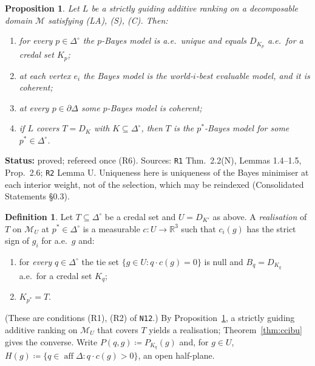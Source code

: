 \documentclass[11pt]{article}
\newtheorem{proposition}[theorem]{Proposition}
\theoremstyle{definition}
\newtheorem{definition}[theorem]{Definition}
\theoremstyle{remark}
\newcommand{\R}{\mathbb R}
\newcommand{\Di}{\Delta^{\circ}}
\newcommand{\M}{\mathcal M}
\newcommand{\aff}{\operatorname{aff}}
\newcommand{\src}[1]{\texttt{#1}}
\newcommand{\status}[1]{\par\smallskip\noindent\textbf{Status:} #1\par\smallskip}
\begin{document}
\begin{proposition}\label{prop:necessary}
Let $L$ be a strictly guiding additive ranking on a decomposable domain $\M$ satisfying (LA), (S), (C). Then:
\begin{enumerate}[leftmargin=*,label=(\alph*)]
\item for every $p\in\Di$ the $p$-Bayes model is a.e.\ unique and equals $D_{K_p}$ a.e.\ for a credal set $K_p$;
\item at each vertex $e_i$ the Bayes model is the world-$i$-best evaluable model, and it is coherent;
\item at every $p\in\partial\Delta$ some $p$-Bayes model is coherent;
\item if $L$ covers $T=D_K$ with $K\subseteq\Di$, then $T$ is the $p^*$-Bayes model for some $p^*\in\Di$.
\end{enumerate}
\end{proposition}
\status{proved; refereed once (R6). Sources: \src{R1} Thm.~2.2(N), Lemmas 1.4--1.5, Prop.~2.6; \src{R2} Lemma U. Uniqueness here is uniqueness of the Bayes minimiser at each interior weight, not of the selection, which may be reindexed (Consolidated Statements \S0.3).}

\begin{definition}\label{def:realisation}
Let $T\subseteq\Di$ be a credal set and $U=D_{K'}$ as above. A \emph{realisation} of $T$ on $\M_U$ at $p^*\in\Di$ is a measurable $c:U\to\R^3$ such that $c_i(g)$ has the strict sign of $g_i$ for a.e.\ $g$ and:
\begin{enumerate}[leftmargin=*]
\item[\textbf{(BU)}] for \emph{every} $q\in\Di$ the tie set $\{g\in U:q\cdot c(g)=0\}$ is null and $B_q=D_{K_q}$ a.e.\ for a credal set $K_q$;
\item[\textbf{(TP)}] $K_{p^*}=T$.
\end{enumerate}
\end{definition}
(These are conditions (R1), (R2) of \src{N12}.) By Proposition~\ref{prop:necessary}, a strictly guiding additive ranking on $\M_U$ that covers $T$ yields a realisation; Theorem~\ref{thm:ccibu} gives the converse. Write $P(q,g)\coloneqq P_{K_q}(g)$ and, for $g\in U$, $H(g)\coloneqq\{q\in\aff\Delta:q\cdot c(g)>0\}$, an open half-plane.
\end{document}
